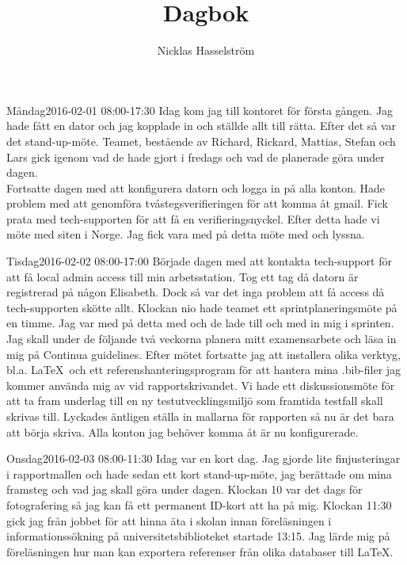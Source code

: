 \documentclass[a4paper,oneside]{book}
\title{\Huge Dagbok}
\author{Nicklas Hasselström}
\date{}
\begin{document}
\reversemarginpar
{}
\maketitle
\newpage

\begin{diary}{Måndag}{2016-02-01 08:00-17:30}
	Idag kom jag till kontoret för första gången. Jag hade fått en dator och jag kopplade in och ställde allt till rätta. Efter det så var det stand-up-möte. Teamet, bestående av Richard, Rickard, Mattias, Stefan och Lars gick igenom vad de hade gjort i fredags och vad de planerade göra under dagen.\\
	Fortsatte dagen med att konfigurera datorn och logga in på alla konton. Hade problem med att genomföra tvåstegsverifieringen för att komma åt gmail. Fick prata med tech-supporten för att få en verifieringsnyckel. Efter detta hade vi möte med siten i Norge. Jag fick vara med på detta möte med och lyssna.
\end{diary}

\begin{diary}{Tisdag}{2016-02-02 08:00-17:00}
	Började dagen med att kontakta tech-support för att få local admin access till min arbetsstation. Tog ett tag då datorn är registrerad på någon Elisabeth. Dock så var det inga problem att få access då tech-supporten skötte  allt. Klockan nio hade teamet ett sprintplaneringsmöte på en timme. Jag var med på detta med och de lade till och med in mig i sprinten. Jag skall under de följande två veckorna planera mitt examensarbete och läsa in mig på Continua guidelines. Efter mötet fortsatte jag att installera olika verktyg, bl.a. \LaTeX\ och ett referenshanteringsprogram för att hantera mina .bib-filer jag kommer använda mig av vid rapportskrivandet. Vi hade ett diskussionsmöte för att ta fram underlag till en ny testutvecklingsmiljö som framtida testfall skall skrivas till. Lyckades äntligen ställa in mallarna för rapporten så nu är det bara att börja skriva. Alla konton jag behöver komma åt är nu konfigurerade.
\end{diary}

\begin{diary}{Onsdag}{2016-02-03 08:00-11:30}
	Idag var en kort dag. Jag gjorde lite finjusteringar i rapportmallen och hade sedan ett kort stand-up-möte, jag berättade om mina framsteg och vad jag skall göra under dagen. Klockan 10 var det dags för fotografering så jag kan få ett permanent ID-kort att ha på mig. Klockan 11:30 gick jag från jobbet för att hinna äta i skolan innan föreläsningen i informationssökning på universitetsbiblioteket startade 13:15. Jag lärde mig på föreläsningen hur man kan exportera referenser från olika databaser till \LaTeX .
\end{diary}
\end{document}

